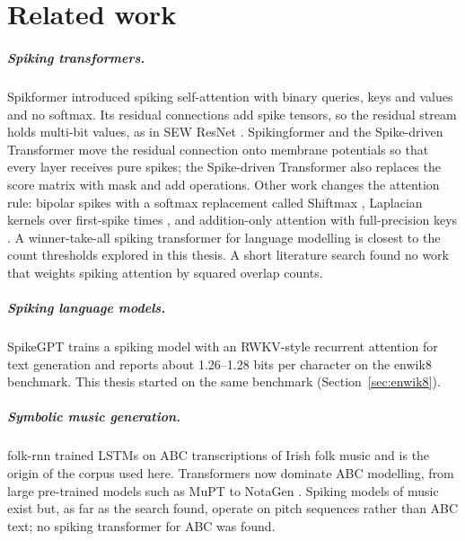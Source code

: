 \chapter{Related work}
\label{ch:related}

\paragraph{Spiking transformers.} Spikformer \citep{zhou2023spikformer} introduced spiking self-attention with
binary queries, keys and values and no softmax. Its residual connections add spike tensors, so the residual stream
holds multi-bit values, as in SEW ResNet \citep{fang2021sew}. Spikingformer \citep{zhou2023spikingformer} and the
Spike-driven Transformer \citep{yao2023spikedriven} move the residual connection onto membrane potentials so that
every layer receives pure spikes; the Spike-driven Transformer also replaces the score matrix with mask and add
operations. Other work changes the attention rule: bipolar spikes with a softmax replacement called Shiftmax
\citep{bipolar2025}, Laplacian kernels over first-spike times \citep{lapis2026}, and addition-only attention with
full-precision keys \citep{a2os2a2025}. A winner-take-all spiking transformer for language modelling
\citep{wta2026} is closest to the count thresholds explored in this thesis. A short literature search found no work
that weights spiking attention by squared overlap counts.

\paragraph{Spiking language models.} SpikeGPT \citep{zhu2023spikegpt} trains a spiking model with an RWKV-style
recurrent attention for text generation and reports about 1.26--1.28 bits per character on the enwik8 benchmark.
This thesis started on the same benchmark (Section~\ref{sec:enwik8}).

\paragraph{Symbolic music generation.} folk-rnn \citep{sturm2016folkrnn} trained LSTMs on ABC transcriptions of
Irish folk music and is the origin of the corpus used here. Transformers now dominate ABC modelling, from large
pre-trained models such as MuPT \citep{qu2024mupt} to NotaGen \citep{wang2025notagen}. Spiking models of music
exist but, as far as the search found, operate on pitch sequences rather than ABC text; no spiking transformer for
ABC was found.


